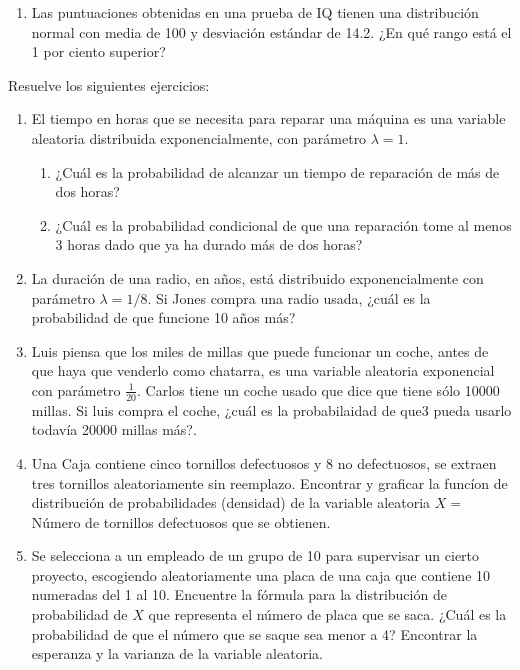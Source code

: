 \begin{Ejer}
\begin{enumerate}
\begin{enumerate}
\item más de 10 años?
\item menos de 5 años?
\item entre 5 y 10 años?
\end{enumerate}

\item Las puntuaciones obtenidas en una prueba de IQ tienen una distribución normal con media de 100 y desviación estándar de 14.2. ¿En qué rango está el 1 por ciento superior?

\end{enumerate}
\end{Ejer} 


\begin{Ejer}
Resuelve los siguientes ejercicios:
\begin{enumerate}

\item El tiempo en horas que se necesita para reparar una máquina es una variable aleatoria distribuida exponencialmente, con parámetro $\lambda=1$.
\begin{enumerate}
\item ¿Cuál es la probabilidad de alcanzar un tiempo de reparación de más de dos horas?
\item ¿Cuál es la probabilidad condicional de que una reparación tome al menos 3 horas dado que ya ha durado más de dos horas?
\end{enumerate}

\item La duración de una radio, en años, está distribuido exponencialmente con parámetro $\lambda=1/8$. Si Jones compra una radio usada, ¿cuál es la probabilidad de que funcione 10 años más?

\item Luis piensa que los miles de millas que puede funcionar un coche, antes de que haya que venderlo como chatarra, es una variable aleatoria exponencial con parámetro $\frac{1}{20}$. Carlos tiene un coche usado que dice que tiene sólo 10000 millas. Si luis compra el coche, ¿cuál es la probabilaidad de que3 pueda usarlo todavía 20000 millas más?.

\item Una Caja contiene cinco tornillos defectuosos y 8 no defectuosos, se extraen tres tornillos aleatoriamente sin reemplazo. Encontrar y graficar la funcíon de distribución de probabilidades (densidad) de la variable aleatoria $X=$Número de tornillos defectuosos que se obtienen.
\item Se selecciona a un empleado de un grupo de 10 para supervisar un cierto proyecto, escogiendo aleatoriamente una placa de una caja que contiene 10 numeradas del 1 al 10. Encuentre la fórmula para la distribución de probabilidad de $X$ que representa el número de placa que se saca. ¿Cuál es la probabilidad de que el número que se saque sea menor a 4? Encontrar la esperanza y la varianza de la variable aleatoria.




\end{enumerate}
\end{Ejer}
